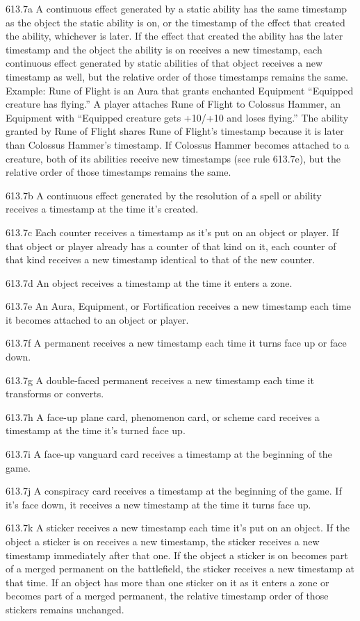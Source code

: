 613.7a A continuous effect generated by a static ability has the same timestamp as the object the static ability is on, or the timestamp of the effect that created the ability, whichever is later. If the effect that created the ability has the later timestamp and the object the ability is on receives a new timestamp, each continuous effect generated by static abilities of that object receives a new timestamp as well, but the relative order of those timestamps remains the same.
Example: Rune of Flight is an Aura that grants enchanted Equipment “Equipped creature has flying.” A player attaches Rune of Flight to Colossus Hammer, an Equipment with “Equipped creature gets +10/+10 and loses flying.” The ability granted by Rune of Flight shares Rune of Flight’s timestamp because it is later than Colossus Hammer’s timestamp. If Colossus Hammer becomes attached to a creature, both of its abilities receive new timestamps (see rule 613.7e), but the relative order of those timestamps remains the same.

613.7b A continuous effect generated by the resolution of a spell or ability receives a timestamp at the time it’s created.

613.7c Each counter receives a timestamp as it’s put on an object or player. If that object or player already has a counter of that kind on it, each counter of that kind receives a new timestamp identical to that of the new counter.

613.7d An object receives a timestamp at the time it enters a zone.

613.7e An Aura, Equipment, or Fortification receives a new timestamp each time it becomes attached to an object or player.

613.7f A permanent receives a new timestamp each time it turns face up or face down.

613.7g A double-faced permanent receives a new timestamp each time it transforms or converts.

613.7h A face-up plane card, phenomenon card, or scheme card receives a timestamp at the time it’s turned face up.

613.7i A face-up vanguard card receives a timestamp at the beginning of the game.

613.7j A conspiracy card receives a timestamp at the beginning of the game. If it’s face down, it receives a new timestamp at the time it turns face up.

613.7k A sticker receives a new timestamp each time it’s put on an object. If the object a sticker is on receives a new timestamp, the sticker receives a new timestamp immediately after that one. If the object a sticker is on becomes part of a merged permanent on the battlefield, the sticker receives a new timestamp at that time. If an object has more than one sticker on it as it enters a zone or becomes part of a merged permanent, the relative timestamp order of those stickers remains unchanged.

